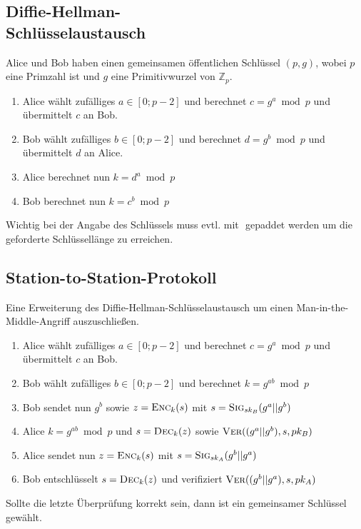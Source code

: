 \documentclass[a4paper,landscape]{article}
\newcommand{\skey}{\ensuremath{sk}}
\newcommand{\pkey}{\ensuremath{pk}}
\newcommand{\enc}{\textsc{Enc}}
\newcommand{\dec}{\textsc{Dec}}
\newcommand{\sig}{\textsc{Sig}}
\newcommand{\ver}{\textsc{Ver}}
\begin{document}
\begin{multicols*}{4}
	\subsection[Diffie-Hellman-Schlüsselaustausch]{Diffie-Hellman-\\Schlüsselaustausch}
	Alice und Bob haben einen gemeinsamen öffentlichen Schlüssel \((p,g)\),
	wobei \(p\) eine Primzahl ist und \(g\) eine Primitivwurzel von
	\(\mathbb{Z}_{p}\).
	\begin{enumerate}
		\item Alice wählt zufälliges $a \in [0;p-2]$ und berechnet $c = g^a \bmod p$
		      und übermittelt $c$ an Bob.
		\item Bob wählt zufälliges $b \in [0;p-2]$ und berechnet $d = g^b \bmod p$
		      und übermittelt $d$ an Alice.
		\item Alice berechnet nun $k = d^a \bmod p$
		\item Bob berechnet nun $k = c^b \bmod p$
	\end{enumerate}
	Wichtig bei der Angabe des Schlüssels muss evtl. mit \(\) gepaddet werden um
	die geforderte Schlüssellänge zu erreichen.

	\subsection{Station-to-Station-Protokoll}
	Eine Erweiterung des Diffie-Hellman-Schlüsselaustausch um einen
	Man-in-the-Middle-Angriff auszuschließen.
	\begin{enumerate}
		\item Alice wählt zufälliges $a \in [0;p-2]$ und berechnet $c = g^{a} \bmod p$
		      und übermittelt $c$ an Bob.
		\item Bob wählt zufälliges $b \in [0;p-2]$ und berechnet $k = g^{ab} \bmod p$
		\item Bob sendet nun $g^{b}$ sowie $z = \enc_{k}(s)$ mit $s = \sig_{\skey_{B}}(g^{a}||g^{b})$
		\item Alice $k = g^{ab} \bmod p$ und $s = \dec_{k}(z)$ sowie $\ver((g^{a}||g^{b}),s,\pkey_{B})$
		\item Alice sendet nun $z = \enc_{k}(s)$ mit $s = \sig_{\skey_{A}}(g^{b}||g^{a})$
		\item Bob entschlüsselt $s = \dec_{k}(z)$ und verifiziert $\ver((g^{b}||g^{a}),s,\pkey_{A})$
	\end{enumerate}
	Sollte die letzte Überprüfung korrekt sein, dann ist ein gemeinsamer Schlüssel gewählt.


\end{multicols*}
\end{document}
